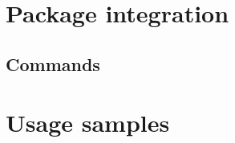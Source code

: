 \section{Package integration}
\label{sec:integration}



\subsection{Commands}
\label{sec:commands}

\section{Usage samples}
\label{sec:sample}
